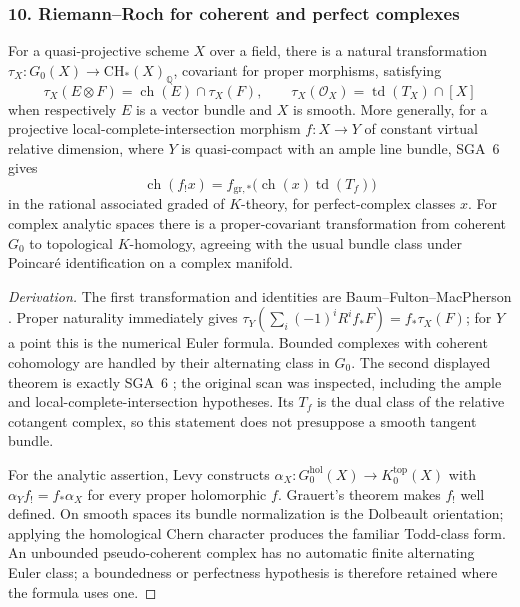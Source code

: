 \subsubsection{10. Riemann--Roch for coherent and perfect complexes}
\begin{proposition}\label{B:subject10}
For a quasi-projective scheme $X$ over a field, there is a natural transformation
$\tau_X:G_0(X)\to\mathrm{CH}_*(X)_{\mathbb Q}$, covariant for proper morphisms, satisfying
\[
 \tau_X(E\otimes F)=\operatorname{ch}(E)\cap\tau_X(F),
 \qquad \tau_X(\mathcal O_X)=\operatorname{td}(T_X)\cap[X]
\]
when respectively $E$ is a vector bundle and $X$ is smooth. More generally, for a projective local-complete-intersection morphism $f:X\to Y$ of constant virtual relative dimension, where $Y$ is quasi-compact with an ample line bundle, SGA~6 gives
\[
 \operatorname{ch}(f_!x)=f_{\mathrm{gr},*}
       \bigl(\operatorname{ch}(x)\operatorname{td}(T_f)\bigr)
\]
in the rational associated graded of $K$-theory, for perfect-complex classes $x$.
For complex analytic spaces there is a proper-covariant transformation from coherent $G_0$ to topological $K$-homology, agreeing with the usual bundle class under Poincar\'e identification on a complex manifold.
\end{proposition}
\begin{proof}[Derivation]
The first transformation and identities are Baum--Fulton--MacPherson \cite[Introduction theorem; Chapters I.6 and II.3]{BBFM1975}. Proper naturality immediately gives $\tau_Y(\sum_i(-1)^iR^if_*F)=f_*\tau_X(F)$; for $Y$ a point this is the numerical Euler formula. Bounded complexes with coherent cohomology are handled by their alternating class in $G_0$. The second displayed theorem is exactly SGA~6 \cite[Expos\'e VIII, Theorem 3.6, internal p.~20]{BSGA6}; the original scan was inspected, including the ample and local-complete-intersection hypotheses. Its $T_f$ is the dual class of the relative cotangent complex, so this statement does not presuppose a smooth tangent bundle.

For the analytic assertion, Levy \cite[Introduction, Riemann--Roch theorem, pp.~149--150]{BLevy1987} constructs $\alpha_X:G_0^{\mathrm{hol}}(X)\to K_0^{\mathrm{top}}(X)$ with $\alpha_Yf_!=f_*\alpha_X$ for every proper holomorphic $f$. Grauert's theorem makes $f_!$ well defined. On smooth spaces its bundle normalization is the Dolbeault orientation; applying the homological Chern character produces the familiar Todd-class form. An unbounded pseudo-coherent complex has no automatic finite alternating Euler class; a boundedness or perfectness hypothesis is therefore retained where the formula uses one.
\end{proof}

